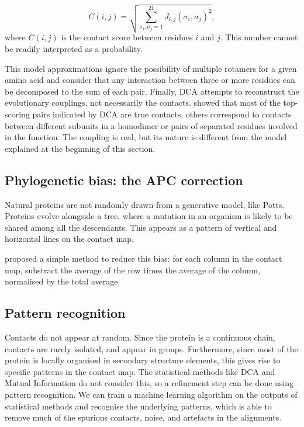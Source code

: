 \begin{equation*}
C(i, j) = \sqrt{\sum_{\sigma_i, \sigma_j=1}^{21} J_{i, j}(\sigma_i, \sigma_j)^2},
\end{equation*}
where $C(i, j)$ is the contact score between residues $i$ and $j$.
This number cannot be readily interpreted as a probability.

This model approximations ignore the possibility of multiple rotamers for a given amino acid 
and consider that any interaction between three or more residues can be decomposed to the sum of each pair.
Finally, DCA attempts to reconstruct the evolutionary couplings, not necessarily the contacts.
\citet{contact_errors} showed that most of the top-scoring pairs indicated by DCA are true contacts, others correspond to contacts between different subunits in a homodimer or pairs of separated residues involved in the function.
The coupling is real, but its nature is different from the model explained at the beginning of this section.

\subsection[Phylogenetic bias]{Phylogenetic bias: the APC correction}
Natural proteins are not randomly drawn from a generative model, like Potts.
Proteins evolve alongside a tree, where a mutation in an organism is likely to be shared among all the descendants.
This appears as a pattern of vertical and horizontal lines on the contact map.

\citet{apc} proposed a simple method to reduce this bias: for each column in the contact map, substract the average of the row times the average of the column, normalised by the total average.


\subsection{Pattern recognition}
Contacts do not appear at random.
Since the protein is a continuous chain, contacts are rarely isolated, and appear in groups.
Furthermore, since most of the protein is locally organised in secondary structure elements, this gives rise to specific patterns in the contact map.
The statistical methods like DCA and Mutual Information do not consider this, so a refinement step can be done using pattern recognition.
We can train a machine learning algorithm on the outputs of statistical methods and recognise the underlying patterns, which is able to remove much of the spurious contacts, noise, and artefacts in the alignments.

